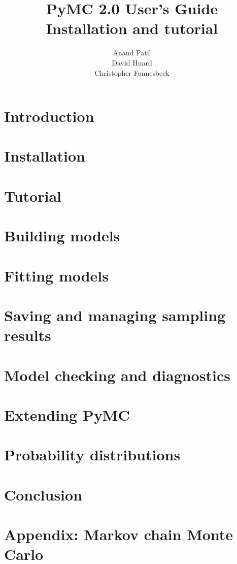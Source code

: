 \documentclass[]{manual}
\title{PyMC 2.0 User's Guide \\
Installation and tutorial}
\author{Anand Patil \\ David Huard \\ Christopher Fonnesbeck}
\begin{document}
\maketitle

\tableofcontents
\chapter{Introduction}
\label{chap:intro}


\chapter{Installation}
\label{chap:install}


\chapter{Tutorial}
\label{chap:tutorial}


\chapter{Building models}
\label{chap:modelbuilding}


\chapter{Fitting models}
\label{chap:modelfitting}


\chapter{Saving and managing sampling results}
\label{chap:database}


\chapter{Model checking and diagnostics}
\label{chap:modelchecking}


\chapter{Extending PyMC}
\label{chap:extending}


\chapter{Probability distributions}
\label{chap:distributions}


\chapter{Conclusion}
\label{chap:conclusion}


\appendix
\chapter{Appendix: Markov chain Monte Carlo}
\label{chap:MCMC}


\nocite{Bernardo:1992fk}


\end{document}
